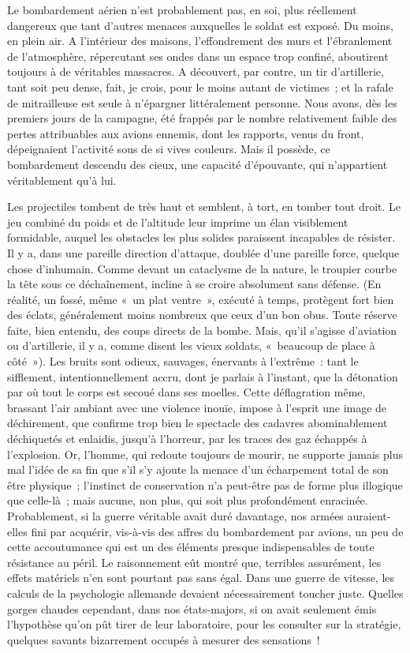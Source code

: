\documentclass[french,twoside]{book} %
\begin{document}
Le bombardement aérien n’est probablement pas, en soi, plus réellement dangereux que tant d’autres menaces auxquelles le soldat est exposé. Du moins, en plein air. A l’intérieur des maisons, l’effondrement des murs et l’ébranlement de l’atmosphère, répercutant ses ondes dans un espace trop confiné, aboutirent toujours à de véritables massacres. A découvert, par contre, un tir d’artillerie, tant soit peu dense, fait, je crois, pour le moins autant de victimes ; et la rafale de mitrailleuse est seule à n’épargner littéralement personne. Nous avons, dès les premiers jours de la campagne, été frappés par le nombre relativement faible des pertes attribuables aux avions ennemis, dont les rapports, venus du   front, dépeignaient l’activité sous de si vives couleurs. Mais il possède, ce bombardement descendu des cieux, une capacité d’épouvante, qui n’appartient véritablement qu’à lui.\par
Les projectiles tombent de très haut et semblent, à tort, en tomber tout droit. Le jeu combiné du poids et de l’altitude leur imprime un élan visiblement formidable, auquel les obstacles les plus solides paraissent incapables de résister. Il y a, dans une pareille direction d’attaque, doublée d’une pareille force, quelque chose d’inhumain. Comme devant un cataclysme de la nature, le troupier courbe la tête sous ce déchaînement, incline à se croire absolument sans défense. (En réalité, un fossé, même « un plat ventre », exécuté à temps, protègent fort bien des éclats, généralement moins nombreux que ceux d’un bon obus. Toute réserve faite, bien entendu, des coups directs de la bombe. Mais, qu’il s’agisse d’aviation ou d’artillerie, il y a, comme disent les vieux soldats, « beaucoup de place à côté »). Les bruits sont odieux, sauvages, énervants à l’extrême : tant le sifflement, intentionnellement accru, dont je parlais à l’instant, que la détonation par où tout le corps est secoué dans ses moelles. Cette déflagration même, brassant l’air ambiant avec une violence inouïe, impose à l’esprit une image de déchirement, que confirme trop bien le spectacle des cadavres abominablement déchiquetés et enlaidis, jusqu’à l’horreur, par les traces des gaz échappés à l’explosion. Or, l’homme, qui redoute toujours de mourir, ne supporte jamais plus mal l’idée de sa fin que s’il s’y ajoute la menace d’un écharpement total de son être physique ; l’instinct de conservation n’a peut-être pas de forme plus illogique que celle-là ; mais aucune, non plus, qui soit plus profondément enracinée. Probablement, si la guerre véritable avait duré davantage, nos armées auraient-elles fini par acquérir, vis-à-vis des affres du bombardement par avions, un peu de cette accoutumance qui est un   des éléments presque indispensables de toute résistance au péril. Le raisonnement eût montré que, terribles assurément, les effets matériels n’en sont pourtant pas sans égal. Dans une guerre de vitesse, les calculs de la psychologie allemande devaient nécessairement toucher juste. Quelles gorges chaudes cependant, dans nos états-majors, si on avait seulement émis l’hypothèse qu’on pût tirer de leur laboratoire, pour les consulter sur la stratégie, quelques savants bizarrement occupés à mesurer des sensations !\par
\end{document}

